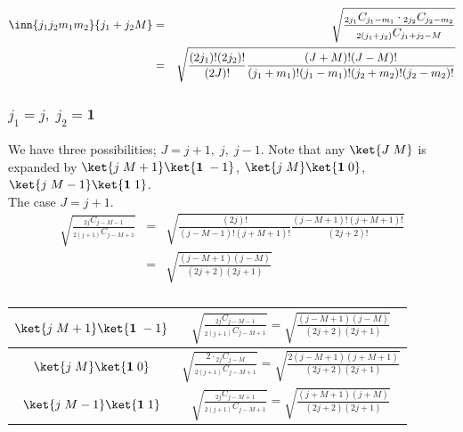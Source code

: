 \documentclass{article}
\begin{document}
{\begin{eqnarray}
\inn{j_1j_2m_1m_2}{j_1+j_2M}  & = & \sqrt{\frac{ {}_{2j_1}C_{j_1 -m_1}\cdot {}_{2j_2}C_{j_2-m_2}}{{}_{2(j_1+j_2)}C_{j_1 +j_2 -M}}} \\
                                                                & = & \sqrt{\frac{(2j_1)!(2j_2)! }{(2J)!} \frac{(J+M)!(J-M)!}{(j_1+m_1)!(j_1-m_1)!(j_2+m_2)!(j_2-m_2)!}} 
\end{eqnarray}
\subsubsection{$j_1 = j, \;j_2=\mathbf{1}$}
\label{sec-5-3-2}
We have three possibilities; $J = j+1, \;j,\;j-1$. Note that any $\ket{J \;M}$ is expanded by $\ket{j\;M+1}\ket{\mathbf{1} \; -1}$, $\ket{j \; M}\ket{\mathbf{1}\;0}$, $\ket{j \;M-1}\ket{\mathbf{1}\;1}$.\\
 The case $J = j+1$.
\begin{eqnarray}
\sqrt{\frac{ {}_{2j}C_{j -M-1} }{{}_{2(j+1)}C_{j -M +1}}}& = &
 \sqrt{\frac{(2j)!}{(j-M-1)!(j+M+1)!} \frac{(j-M+1)!(j+M+1)!}{(2j +2)!}} \\
 & = &  \sqrt{\frac{(j-M+1)(j-M)}{(2j+2)(2j+1)} }
\end{eqnarray}
\begin{table}[htb]
  \centering 
  \caption{}\label{}
  \begin{tabular}{|c|c|}
\hline
 $\ket{j\;M+1}\ket{\mathbf{1} \; -1}$  &  
 $\displaystyle \sqrt{\frac{ {}_{2j}C_{j -M-1} }{{}_{2(j+1)}C_{j -M +1}}} = \sqrt{\frac{(j-M+1)(j-M)}{(2j+2)(2j+1)} }$  \\ \hline
 $\ket{j \; M}\ket{\mathbf{1}\;0}$  &   
 $\displaystyle \sqrt{\frac{ 2\cdot {}_{2j}C_{j -M} }{{}_{2(j+1)}C_{j -M+1}}} = \sqrt{\frac{2(j-M+1)(j+M+1)}{(2j+2)(2j+1)} }$  \\ \hline
 $\ket{j \;M-1}\ket{\mathbf{1}\;1}$  &  
 $\displaystyle \sqrt{\frac{ {}_{2j}C_{j -M+1} }{{}_{2(j+1)}C_{j -M+1 }}} = \sqrt{\frac{(j+M+1)(j+M)}{(2j+2)(2j+1)} }$  \\ \hline
\end{tabular}
\end{table}

}
\end{document}
